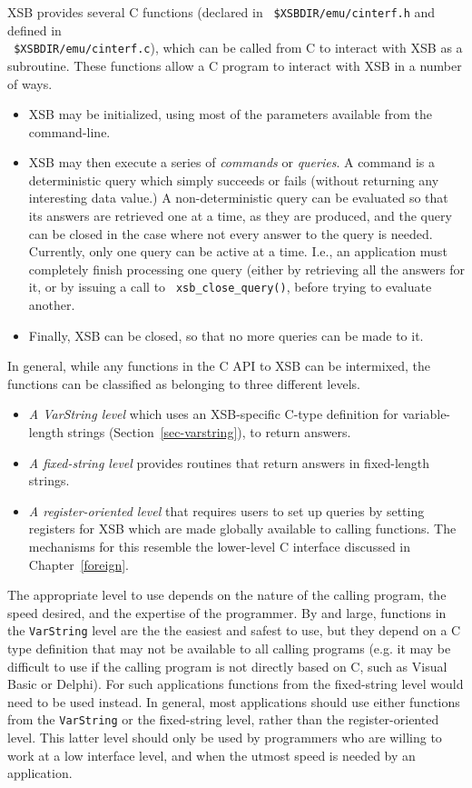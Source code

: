 XSB provides several C functions (declared in {\tt
  \$XSBDIR/emu/cinterf.h} and defined in \\ {\tt
  \$XSBDIR/emu/cinterf.c}), which can be called from C to interact
with XSB as a subroutine. These functions allow a C program to
interact with XSB in a number of ways.
\begin{itemize}
\item XSB may be initialized, using most of the parameters available
  from the command-line. 
%
\item XSB may then execute a series of {\em commands} or {\em
  queries}.  A command is a deterministic query which simply succeeds
  or fails (without returning any interesting data value.)  A
  non-deterministic query can be evaluated so that its answers are
  retrieved one at a time, as they are produced, and the query can be
  closed in the case where not every answer to the query is needed.
  Currently, only one query can be active at a time.  I.e., an
  application must completely finish processing one query (either by
  retrieving all the answers for it, or by issuing a call to {\tt
    xsb\_close\_query()}, before trying to evaluate another.
%
\item Finally, XSB can be closed, so that no more queries can be made
  to it.
\end{itemize}

In general, while any functions in the C API to XSB can be intermixed,
the functions can be classified as belonging to three different
levels.
%
\begin{itemize}
\item {\em A VarString level} which uses an XSB-specific C-type
  definition for variable-length strings
  (Section~\ref{sec-varstring}), to return answers.
%
\item {\em A fixed-string level} provides routines that return answers
  in fixed-length strings.
%
\item {\em A register-oriented level} that requires users to set up
  queries by setting registers for XSB which are made globally
  available to calling functions.  The mechanisms for this resemble
  the lower-level C interface discussed in Chapter~\ref{foreign}.
\end{itemize}
%
The appropriate level to use depends on the nature of the calling
program, the speed desired, and the expertise of the programmer.  By
and large, functions in the {\tt VarString} level are the the easiest
and safest to use, but they depend on a C type definition that may not
be available to all calling programs (e.g. it may be difficult to use
if the calling program is not directly based on C, such as Visual
Basic or Delphi).  For such applications functions from the
fixed-string level would need to be used instead.  In general, most
applications should use either functions from the {\tt VarString} or
the fixed-string level, rather than the register-oriented level.  This
latter level should only be used by programmers who are willing to
work at a low interface level, and when the utmost speed is needed by
an application.


